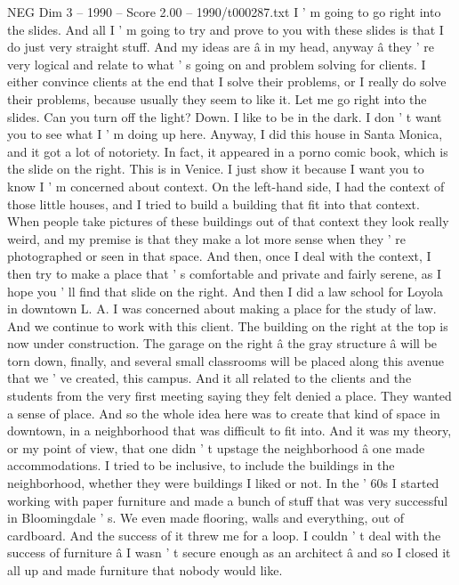 \begin{textsample}{NEG Dim 3 – 1990 – Score 2.00 – 1990/t000287.txt}  \label{ex:f3_neg_015}
I ' m going to go right into the slides.
And all I ' m going to try and prove to you with these slides is that I do just very straight stuff.
And my ideas are â in my head, anyway â they ' re very logical and relate to what ' s going on and problem solving for clients.
I either convince clients at the end that I solve their problems, or I really do solve their problems, because usually they seem to like it.
Let me go right into the slides.
Can you turn off the light?
Down.
I like to be in the dark.
I don ' t want you to see what I ' m doing up here.
Anyway, I did this house in Santa Monica, and it got a lot of notoriety.
In fact, it appeared in a porno comic book, which is the slide on the right.
This is in Venice.
I just show it because I want you to know I ' m concerned about context.
On the left-hand side, I had the context of those little houses, and I tried to build a building that fit into that context.
When people take pictures of these buildings out of that context they look really weird, and my premise is that they make a lot more sense when they ' re photographed or seen in that space.
And then, once I deal with the context, I then try to make a place that ' s comfortable and private and fairly serene, as I hope you ' ll find that slide on the right.
And then I did a law school for Loyola in downtown L.
A.
I was concerned about making a place for the study of law.
And we continue to work with this client.
The building on the right at the top is now under construction.
The garage on the right â the gray structure â will be torn down, finally, and several small classrooms will be placed along this avenue that we ' ve created, this campus.
And it all related to the clients and the students from the very first meeting saying they felt denied a place.
They wanted a sense of place.
And so the whole idea here was to create that kind of space in downtown, in a neighborhood that was difficult to fit into.
And it was my theory, or my point of view, that one didn ' t upstage the neighborhood â one made accommodations.
I tried to be inclusive, to include the buildings in the neighborhood, whether they were buildings I liked or not.
In the ' 60s I started working with paper furniture and made a bunch of stuff that was very successful in Bloomingdale ' s.
We even made flooring, walls and everything, out of cardboard.
And the success of it threw me for a loop.
I couldn ' t deal with the success of furniture â I wasn ' t secure enough as an architect â and so I closed it all up and made furniture that nobody would like.

\end{textsample}
